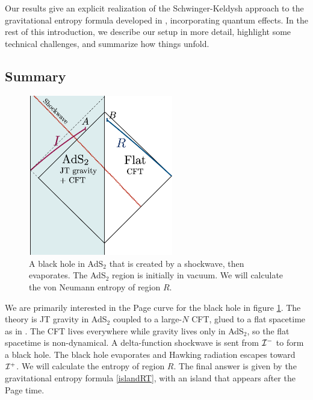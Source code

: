 \documentclass[12pt]{article}
\numberwithin{equation}{section}
\begin{document}
\begin{spacing}{1.1}
\begin{itemize}
\end{itemize}
Our results give an explicit realization of the Schwinger-Keldysh approach to the gravitational entropy formula developed in \cite{Dong:2016hjy}, incorporating quantum effects. 
In the rest of this introduction, we describe our setup in more detail, highlight some technical challenges, and summarize how things unfold.

\subsection{Summary}
\begin{figure}
      \begin{center}
     \includegraphics[height=7cm]{figures/onesided.png}
  \caption{\small A black hole in AdS$_2$ that is created by a shockwave, then evaporates. The AdS$_2$ region is initially in vacuum. We will calculate the von Neumann entropy of region $R$.}
  \label{fig:setup-onesided}
 \end{center}
 \end{figure}
 
We are primarily interested in the Page curve for the black hole in figure \ref{fig:setup-onesided}. The theory is JT gravity in AdS$_2$ coupled to a large-$N$ CFT, glued to a flat spacetime as in \cite{Engelsoy:2016xyb, Almheiri:2019psf}. The CFT lives everywhere while gravity lives only in AdS$_2$, so the flat spacetime is non-dynamical. A delta-function shockwave is sent from ${\cal I}^-$ to form a black hole. The black hole evaporates and Hawking radiation escapes toward ${\cal I}^+$. We will calculate the entropy of region $R$. The final answer \cite{Almheiri:2019psf} is given by the gravitational entropy formula \eqref{islandRT}, with an island that appears after the Page time.


\end{spacing}
\end{document}

